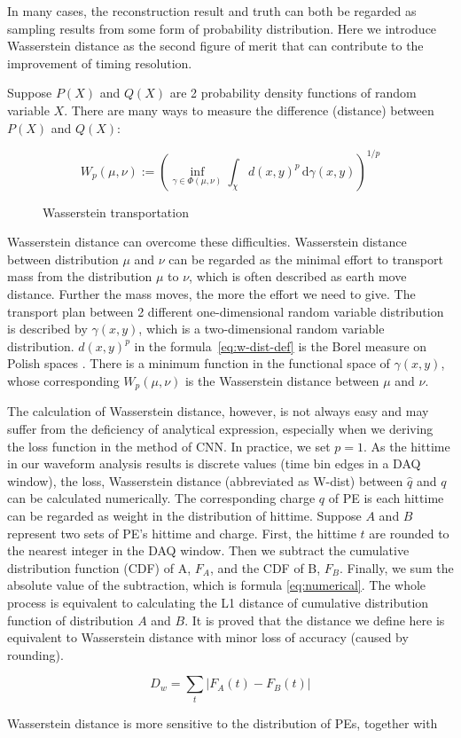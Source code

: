 In many cases, the reconstruction result and truth can both be regarded as sampling results from some form of probability distribution. Here we introduce Wasserstein distance as the second figure of merit that can contribute to the improvement of timing resolution. 

Suppose $P(X)$ and $Q(X)$ are 2 probability density functions of random variable $X$. There are many ways to measure the difference (distance) between $P(X)$ and $Q(X)$: 

\label{sub:Wasserstein distance}
\begin{minipage}{.45\textwidth}
\begin{equation}
    W_{p}(\mu,\nu):=\left(\inf_{\gamma\in\Phi(\mu,\nu)}\int_{\chi}d(x,y)^{p}\,\mathrm{d}\gamma(x,y)\right)^{1/p} \label{eq:w-dist-def}
\end{equation}
\end{minipage}
\begin{minipage}{.55\textwidth}
\begin{figure}[H]
    \centering
    \scalebox{0.4}{}
    \caption{\label{fig:Wasserstein transportation} Wasserstein transportation}
\end{figure}
\end{minipage}



Wasserstein distance can overcome these difficulties. Wasserstein distance between distribution $\mu$ and $\nu$ can be regarded as the minimal effort to transport mass from the distribution $\mu$ to $\nu$, which is often described as earth move distance. Further the mass moves, the more the effort we need to give. The transport plan between 2 different one-dimensional random variable distribution is described by $\gamma(x, y)$, which is a two-dimensional random variable distribution. $d(x,y)^{p}$ in the formula~\eqref{eq:w-dist-def} is the Borel measure on Polish spaces \cite{villani_2009}. There is a minimum function in the functional space of $\gamma(x, y)$, whose corresponding $W_{p}(\mu,\nu)$ is the Wasserstein distance between $\mu$ and $\nu$. 

The calculation of Wasserstein distance, however, is not always easy and may suffer from the deficiency of analytical expression, especially when we deriving the loss function in the method of CNN. In practice, we set $p=1$. As the hittime in our waveform analysis results is discrete values (time bin edges in a DAQ window), the loss, Wasserstein distance (abbreviated as W-dist) between $\hat{q}$ and $q$ can be calculated numerically. The corresponding charge $q$ of PE is each hittime can be regarded as weight in the distribution of hittime. Suppose $A$ and $B$ represent two sets of PE's hittime and charge. First, the hittime $t$ are rounded to the nearest integer in the DAQ window. Then we subtract the cumulative distribution function (CDF) of A, $F_{A}$, and the CDF of B, $F_{B}$. Finally, we sum the absolute value of the subtraction, which is formula \eqref{eq:numerical}. The whole process is equivalent to calculating the L1 distance of cumulative distribution function of distribution $A$ and $B$. It is proved that the distance we define here is equivalent to Wasserstein distance with minor loss of accuracy (caused by rounding). 

\begin{equation}
    D_w = \sum_t|F_{A}(t) - F_{B}(t)|
    \label{eq:numerical}
\end{equation}

Wasserstein distance is more sensitive to the distribution of PEs, together with 